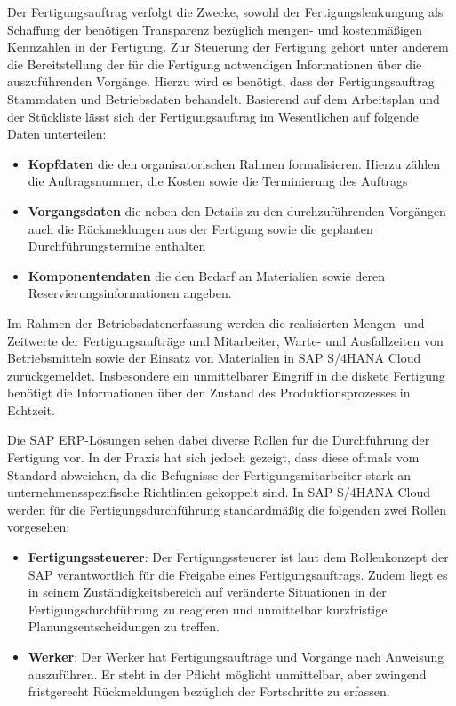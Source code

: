 Der Fertigungsauftrag verfolgt die Zwecke, sowohl der Fertigungslenkungung als Schaffung der benötigen Transparenz bezüglich mengen- und kostenmäßigen Kennzahlen in der Fertigung. Zur Steuerung der Fertigung gehört unter anderem die Bereitstellung der für die Fertigung notwendigen Informationen über die auszuführenden Vorgänge. Hierzu wird es benötigt, dass der Fertigungsauftrag Stammdaten und Betriebsdaten behandelt. Basierend auf dem Arbeitsplan und der Stückliste lässt sich der Fertigungsauftrag im Wesentlichen auf folgende Daten unterteilen:

\begin{itemize}
    \item \textbf{Kopfdaten} die den organisatorischen Rahmen formalisieren. Hierzu zählen die Auftragsnummer, die Kosten sowie die Terminierung des Auftrags
    \item \textbf{Vorgangsdaten} die neben den Details zu den durchzuführenden Vorgängen auch die Rückmeldungen aus der Fertigung sowie die geplanten Durchführungstermine enthalten
    \item \textbf{Komponentendaten} die den Bedarf an Materialien sowie deren Reservierungsinformationen angeben.
\end{itemize}

Im Rahmen der Betriebsdatenerfassung werden die realisierten Mengen- und Zeitwerte der Fertigungsaufträge und Mitarbeiter, Warte- und Ausfallzeiten von Betriebsmitteln sowie der Einsatz von Materialien in SAP S/4HANA Cloud zurückgemeldet. Insbesondere ein unmittelbarer Eingriff in die diskete Fertigung benötigt die Informationen über den Zustand des Produktionsprozesses in Echtzeit. 

Die SAP \ac{ERP}-Lösungen sehen dabei diverse Rollen für die Durchführung der Fertigung vor. In der Praxis hat sich jedoch gezeigt, dass diese oftmals vom Standard abweichen, da die Befugnisse der Fertigungsmitarbeiter stark an unternehmensspezifische Richtlinien gekoppelt sind.
\cite{Frick.2008}
In SAP S/4HANA Cloud werden für die Fertigungsdurchführung standardmäßig die folgenden zwei Rollen vorgesehen:
\begin{itemize}
    \item \textbf{Fertigungssteuerer}: Der Fertigungssteuerer ist laut dem Rollenkonzept der SAP verantwortlich für die Freigabe eines Fertigungsauftrags. Zudem liegt es in seinem Zuständigkeitsbereich auf veränderte Situationen in der Fertigungsdurchführung zu reagieren und unmittelbar kurzfristige Planungsentscheidungen zu treffen.
    \item \textbf{Werker}: Der Werker hat Fertigungsaufträge und Vorgänge nach Anweisung auszuführen. Er steht in der Pflicht möglicht unmittelbar, aber zwingend fristgerecht Rückmeldungen bezüglich der Fortschritte zu erfassen.
\end{itemize}

